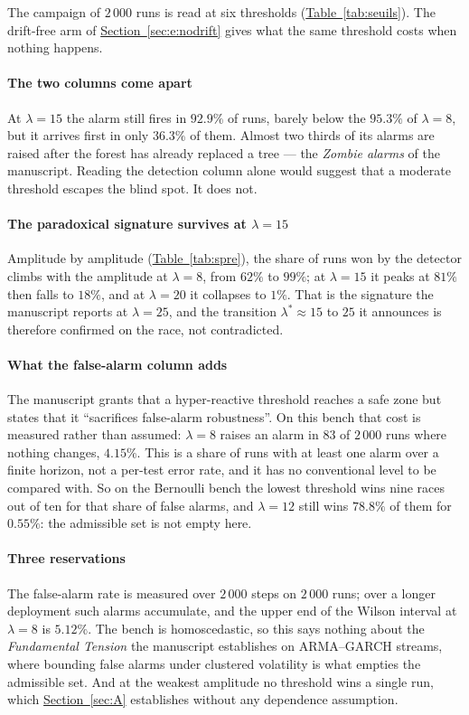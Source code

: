 \documentclass[10pt,conference]{IEEEtran}
\theoremstyle{definition}
\begin{document}
The campaign of $2\,000$ runs is read at six thresholds (\hyperref[tab:seuils]{Table~\ref*{tab:seuils}}). The drift-free arm of \hyperref[sec:e:nodrift]{Section~\ref*{sec:e:nodrift}} gives what the same threshold costs when
nothing happens.


\paragraph{The two columns come apart} At $\lambda = 15$ the alarm still fires in
$92.9\%$ of runs, barely below the $95.3\%$ of $\lambda = 8$, but it arrives first in only
$36.3\%$ of them. Almost two thirds of its alarms are raised after the forest has already
replaced a tree --- the \emph{Zombie alarms} of the manuscript. Reading the detection
column alone would suggest that a moderate threshold escapes the blind spot. It does not.

\paragraph{The paradoxical signature survives at $\lambda = 15$} Amplitude by amplitude
(\hyperref[tab:spre]{Table~\ref*{tab:spre}}), the share of runs won by the detector climbs with the amplitude at
$\lambda = 8$, from $62\%$ to $99\%$; at $\lambda = 15$ it peaks at $81\%$ then falls to
$18\%$, and at $\lambda = 20$ it collapses to $1\%$. That is the signature the manuscript
reports at $\lambda = 25$, and the transition $\lambda^* \approx 15$ to $25$ it announces is
therefore confirmed on the race, not contradicted.

\paragraph{What the false-alarm column adds} The manuscript grants that a hyper-reactive
threshold reaches a safe zone but states that it ``sacrifices false-alarm robustness''. On
this bench that cost is measured rather than assumed: $\lambda = 8$ raises an alarm in
$83$ of $2\,000$ runs where nothing changes, $4.15\%$. This is a share of runs with at least one alarm over a finite horizon, not a
per-test error rate, and it has no conventional level to be compared with. So on the
Bernoulli bench the lowest threshold wins nine races out of ten for that share of false alarms, and $\lambda = 12$ still wins $78.8\%$ of them for $0.55\%$: the admissible
set is not empty here.

\paragraph{Three reservations} The false-alarm rate is measured over $2\,000$ steps on
$2\,000$ runs; over a longer deployment such alarms accumulate, and the upper end of the
Wilson interval at $\lambda = 8$ is $5.12\%$. The bench is homoscedastic, so this says
nothing about the \emph{Fundamental Tension} the manuscript establishes on
ARMA--GARCH streams, where bounding false alarms under clustered volatility is what empties
the admissible set. And at the weakest amplitude no threshold wins a single run, which
\hyperref[sec:A]{Section~\ref*{sec:A}} establishes without any dependence assumption.
\end{document}
